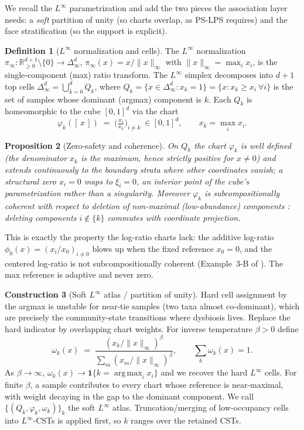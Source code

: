 \documentclass[11pt]{article}
\theoremstyle{definition}
\newtheorem{definition}{Definition}[section]
\newtheorem{construction}[definition]{Construction}
\theoremstyle{plain}
\newtheorem{proposition}[definition]{Proposition}
\theoremstyle{remark}
\newcommand{\R}{\mathbb{R}}
\newcommand{\Rnn}{\R^{d+1}_{\ge 0}}
\newcommand{\Linf}{L^{\infty}}
\newcommand{\Dinf}{\Delta^{d}_{\infty}}
\newcommand{\argmax}{\operatorname*{arg\,max}}
\newcommand{\cell}{Q}
\newcommand{\chart}{\varphi}
\newcommand{\1}{\mathbf{1}}
\newcommand{\norm}[1]{\lVert #1 \rVert}
\begin{document}
We recall the $\Linf$ parametrization \cite{linf} and add the two pieces the
association layer needs: a \emph{soft} partition of unity (so charts overlap, as
PS-LPS requires) and the face stratification (so the support is explicit).

\begin{definition}[$\Linf$ normalization and cells]\label{def:linf}
The $\Linf$ normalization $\pi_\infty:\Rnn\setminus\{0\}\to\Dinf$,
$\pi_\infty(x)=x/\norm{x}_\infty$ with $\norm{x}_\infty=\max_i x_i$, is the
single-component (max) ratio transform. The $\Linf$ simplex decomposes into
$d+1$ top cells $\Dinf=\bigcup_{k=0}^d \cell_k$, where
$\cell_k=\{x\in\Dinf : x_k=1\}=\{x : x_k\ge x_i\ \forall i\}$ is the set of
samples whose dominant (argmax) component is $k$. Each $\cell_k$ is homeomorphic
to the cube $[0,1]^d$ via the chart
\[
  \chart_k([\,x\,]) \;=\; \Big(\tfrac{x_i}{x_k}\Big)_{i\neq k}\ \in[0,1]^d ,
  \qquad x_k=\max_i x_i .
\]
\end{definition}

\begin{proposition}[Zero-safety and coherence]\label{prop:safe}
On $\cell_k$ the chart $\chart_k$ is well defined (the denominator $x_k$ is the
maximum, hence strictly positive for $x\neq0$) and extends continuously to the
boundary strata where other coordinates vanish; a structural zero $x_i=0$ maps
to $\xi_i=0$, an interior point of the cube's parametrization rather than a
singularity. Moreover $\chart_k$ is subcompositionally coherent with respect to
deletion of non-maximal (low-abundance) components \cite{linf}: deleting
components $i\notin\{k\}$ commutes with coordinate projection.
\end{proposition}

This is exactly the property the log-ratio charts lack: the additive log-ratio
$\phi_0(x)=(x_i/x_0)_{i\neq0}$ blows up when the fixed reference $x_0=0$, and the
centered log-ratio is not subcompositionally coherent (Example~3-B of
\cite{linf}). The max reference is adaptive and never zero.

\begin{construction}[Soft $\Linf$ atlas / partition of unity]\label{con:soft}
Hard cell assignment by the argmax is unstable for near-tie samples (two taxa
almost co-dominant), which are precisely the community-state transitions where
dysbiosis lives. Replace the hard indicator by overlapping chart weights. For
inverse temperature $\beta>0$ define
\[
  \omega_k(x)\;=\;\frac{(x_k/\norm{x}_\infty)^{\beta}}
       {\sum_{m}(x_m/\norm{x}_\infty)^{\beta}},
  \qquad \sum_k \omega_k(x)=1 .
\]
As $\beta\to\infty$, $\omega_k(x)\to\1\{k=\argmax_i x_i\}$ and we recover the
hard $\Linf$ cells. For finite $\beta$, a sample contributes to every chart whose
reference is near-maximal, with weight decaying in the gap to the dominant
component. We call $\{(\cell_k,\chart_k,\omega_k)\}_{k}$ the soft $\Linf$ atlas.
Truncation/merging of low-occupancy cells into $\Linf$-CSTs \cite{linf} is
applied first, so $k$ ranges over the retained CSTs.
\end{construction}
\end{document}
